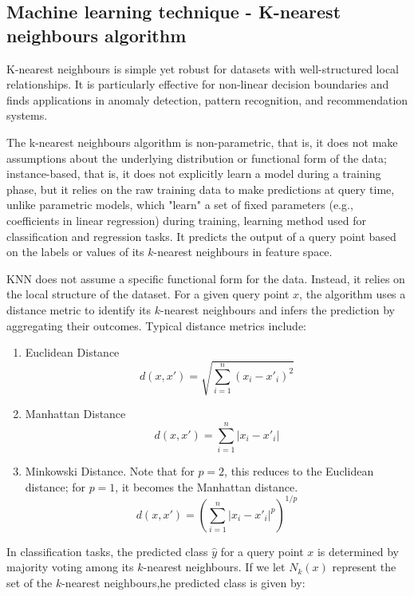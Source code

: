 	
	\bigskip
	\subsection{Machine learning technique - K-nearest neighbours algorithm}
	
	K-nearest neighbours is simple yet robust for datasets with well-structured local relationships. It is particularly effective for non-linear decision boundaries and finds applications in anomaly detection, pattern recognition, and recommendation systems.
	
	The k-nearest neighbours algorithm is non-parametric, that is, it does not make assumptions about the underlying distribution or functional form of the data; instance-based, that is, it does not explicitly learn a model during a training phase, but it relies on the raw training data to make predictions at query time, unlike parametric models, which "learn" a set of fixed parameters (e.g., coefficients in linear regression) during training,   learning method used for classification and regression tasks. It predicts the output of a query point based on the labels or values of its $k$-nearest neighbours in feature space.
	
	KNN does not assume a specific functional form for the data. Instead, it relies on the local structure of the dataset. For a given query point $x$, the algorithm uses a distance metric to identify its $k$-nearest neighbours and infers the prediction by aggregating their outcomes. Typical distance metrics include:
	\begin{enumerate}
		\item Euclidean Distance
		$$
		d(x, x') = \sqrt{\sum_{i=1}^{n} (x_i - x'_i)^2}
		$$
		
		\item Manhattan Distance
		$$
		d(x, x') = \sum_{i=1}^{n} |x_i - x'_i|
		$$
		
		\item Minkowski Distance. Note that for $p = 2$, this reduces to the Euclidean distance; for $p = 1$, it becomes the Manhattan distance.
			$$
			d(x, x') = \left( \sum_{i=1}^{n} |x_i - x'_i|^p \right)^{1/p}
			$$
		\end{enumerate}
		
		
		In classification tasks, the predicted class  $\hat{y}$ for a query point $x$ is determined by majority voting among its  $k$-nearest neighbours. If we let $N_k(x)$ represent the set of the $k$-nearest neighbours,he predicted class is given by:
		
